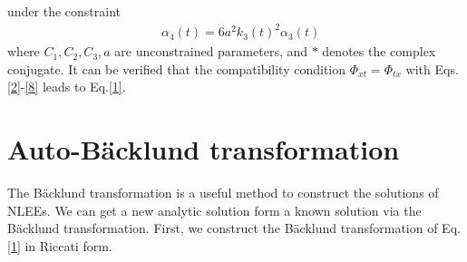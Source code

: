 \documentclass[12pt]{article}
\begin{document}
under the constraint
\begin{align}
  & \alpha_{4}(t) = 6a^{2}k_{3}(t)^{2}\alpha_{3}(t)
\end{align}
where $C_{1}, C_{2}, C_{3}, a$ are unconstrained parameters, and $*$ denotes the complex conjugate. It can be verified that the compatibility condition $\Phi_{xt} = \Phi_{tx}$ with Eqs.\eqref{2}-\eqref{8} leads to Eq.\eqref{1}.

\section{Auto-B\"acklund transformation}
The B\"acklund transformation is a useful method to construct the solutions of NLEEs. We can get a new analytic solution form a known solution via the B\"acklund transformation\cite{7,10,11,12}. First, we construct the B\"acklund transformation of Eq.\eqref{1} in Riccati form.
\end{document}
